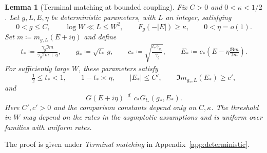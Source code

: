 \documentclass[11pt]{article}
\numberwithin{equation}{section}
\newtheorem{lemma}[theorem]{Lemma}
\theoremstyle{remark}
\begin{document}
\begin{lemma}[Terminal matching at bounded coupling]
\label{fo:lem:bounded-terminal-matching}
Fix $C>0$ and $0<\kappa<1/2$. Let $g,L,E,\eta$ be deterministic
parameters, with $L$ an integer, satisfying
\[
 0<g\le C,\qquad \log W\ll L\le W^2,\qquad
 F_g(-|E|)\ge\kappa,\qquad 0<\eta=o(1).
\]
Set $m\coloneqq m_{g,L}(E+i\eta)$ and define
\begin{equation}\label{bl:eq:terminal}
 \begin{gathered}
 t_*\coloneqq\frac{\gamma_g\Im m}{\gamma_g\Im m+\eta},\qquad
 g_*\coloneqq\sqrt{t_*}\,g,\qquad
 c_*\coloneqq\sqrt{\frac{t_*\gamma_{g_*}}{\gamma_g}},\qquad
 E_*\coloneqq c_*\left(E-\eta\frac{\Re m}{\Im m}\right).
 \end{gathered}
\end{equation}
For sufficiently large $W$, these parameters satisfy
\begin{equation}\label{fo:eq:bounded-terminal-parameters}
 \tfrac12\le t_*<1,\qquad 1-t_*\asymp\eta,\qquad
 |E_*|\le C',\qquad \Im m_{g_*,L}(E_*)\ge c',
\end{equation}
and
\begin{equation}\label{fo:eq:bounded-terminal-resolvent}
 G(E+i\eta)\stackrel d=c_*G_{t_*}(g_*,E_*).
\end{equation}
Here $C',c'>0$ and the comparison constants depend only on $C,\kappa$.
The threshold in $W$ may depend on the rates in the asymptotic assumptions
and is uniform over families with uniform rates.
\end{lemma}
The proof is given under \emph{Terminal matching} in
Appendix~\ref{app:deterministic}.
\end{document}
